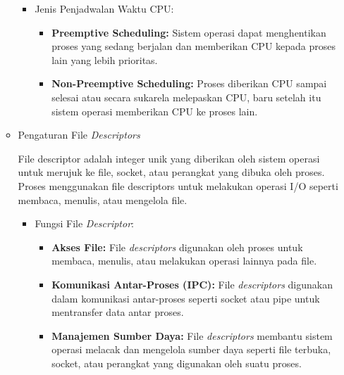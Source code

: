 \documentclass[12pt]{article}
\begin{document}
\begin{itemize}
\begin{itemize}
        \begin{itemize}
            \item Jenis Penjadwalan Waktu CPU:
                \begin{itemize}
                    \item \textbf{Preemptive Scheduling:} Sistem operasi dapat menghentikan proses yang sedang berjalan dan memberikan CPU kepada proses lain yang lebih prioritas.
                    \item \textbf{Non-Preemptive Scheduling:} Proses diberikan CPU sampai selesai atau secara sukarela melepaskan CPU, baru setelah itu sistem operasi memberikan CPU ke proses lain.
                \end{itemize}
        \end{itemize}
        
        \item Pengaturan File \textit{Descriptors}
        
        File descriptor adalah integer unik yang diberikan oleh sistem operasi untuk merujuk ke file, socket, atau perangkat yang dibuka oleh proses. Proses menggunakan file descriptors untuk melakukan operasi I/O seperti membaca, menulis, atau mengelola file.
        
        \begin{itemize}
            \item Fungsi File \textit{Descriptor}:
                \begin{itemize}
                    \item \textbf{Akses File:} File \textit{descriptors} digunakan oleh proses untuk membaca, menulis, atau melakukan operasi lainnya pada file.
                    \item \textbf{Komunikasi Antar-Proses (IPC):} File \textit{descriptors} digunakan dalam komunikasi antar-proses seperti socket atau pipe untuk mentransfer data antar proses.
                    \item \textbf{Manajemen Sumber Daya:} File \textit{descriptors} membantu sistem operasi melacak dan mengelola sumber daya seperti file terbuka, socket, atau perangkat yang digunakan oleh suatu proses.
                \end{itemize}
        \end{itemize}
        
    \end{itemize}


\end{itemize}
\end{document}
